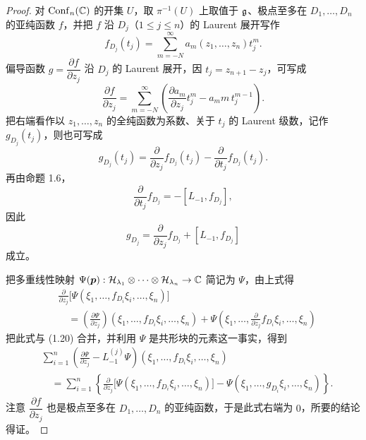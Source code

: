 \begin{proof}
  对 $\operatorname{Conf}_n(\mathbb{C})$ 的开集 $U$，取 $\pi^{-1}(U)$ 上取值于 $\mathfrak{g}$、极点至多在 $D_1,\dots,D_n$ 的亚纯函数 $f$，并把 $f$ 沿 $D_j$（$1\le j\le n$）的 Laurent 展开写作
  \[
  f_{D_j}(t_j)=\sum_{m=-N}^{\infty}a_m(z_1,\dots,z_n)t_j^m .
  \]
  偏导函数 $g=\dfrac{\partial f}{\partial z_j}$ 沿 $D_j$ 的 Laurent 展开，因 $t_j=z_{n+1}-z_j$，可写成
  \[
  \frac{\partial f}{\partial z_j}
  =\sum_{m=-N}^{\infty}\left(\frac{\partial a_m}{\partial z_j}t_j^{m}-a_m m\,t_j^{m-1}\right).
  \]
  把右端看作以 $z_1,\dots,z_n$ 的全纯函数为系数、关于 $t_j$ 的 Laurent 级数，记作 $g_{D_j}(t_j)$，则也可写成
  \[
  g_{D_j}(t_j)=\frac{\partial}{\partial z_j}f_{D_j}(t_j)-\frac{\partial}{\partial t_j}f_{D_j}(t_j).
  \]
  再由命题 1.6，
  \[
  \frac{\partial}{\partial t_j}f_{D_j}=-[L_{-1},f_{D_j}],
  \]
  因此
  \begin{equation}
    g_{D_j}=\frac{\partial}{\partial z_j}f_{D_j}+[L_{-1},f_{D_j}] \tag{1.20}
  \end{equation}
  成立。


把多重线性映射 $\Psi(\bm{p}):\mathcal{H}_{\lambda_1}\otimes\cdots\otimes\mathcal{H}_{\lambda_n}\to\mathbb{C}$ 简记为 $\Psi$，由上式得
\begin{equation}
\begin{aligned}
&\frac{\partial}{\partial z_j}\bigl[\Psi(\xi_1,\dots,f_{D_i}\xi_i,\dots,\xi_n)\bigr]\\
&\quad=\left(\frac{\partial\Psi}{\partial z_j}\right)(\xi_1,\dots,f_{D_i}\xi_i,\dots,\xi_n)
+\Psi\left(\xi_1,\dots,\frac{\partial}{\partial z_j}f_{D_i}\xi_i,\dots,\xi_n\right)
\end{aligned}
\tag{1.21}
\end{equation}
把此式与 (1.20) 合并，并利用 $\Psi$ 是共形块的元素这一事实，得到
\begin{align*}
&\sum_{i=1}^{n}\left(\frac{\partial\Psi}{\partial z_j}-L_{-1}^{(j)}\Psi\right)(\xi_1,\dots,f_{D_i}\xi_i,\dots,\xi_n)\\
&\quad=\sum_{i=1}^{n}\left\{\frac{\partial}{\partial z_j}\bigl[\Psi(\xi_1,\dots,f_{D_i}\xi_i,\dots,\xi_n)\bigr]
-\Psi(\xi_1,\dots,g_{D_i}\xi_i,\dots,\xi_n)\right\}.
\end{align*}
注意 $\dfrac{\partial f}{\partial z_j}$ 也是极点至多在 $D_1,\dots,D_n$ 的亚纯函数，于是此式右端为 $0$，所要的结论得证。
\end{proof}


